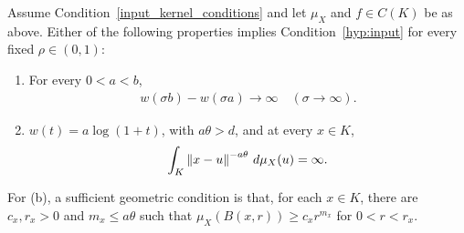 \begin{proposition}\label{prop:global-calibration}
Assume Condition~\ref{input_kernel_conditions} and let $\mu_X$ and $f\in C(K)$ be as above. Either of the following properties implies Condition~\ref{hyp:input} for every fixed $\rho\in(0,1)$:
\begin{enumerate}[label=(\alph*),leftmargin=*]
\item For every $0<a<b$,
\begin{align}\label{eq:input-separation}
w(\sigma b)-w(\sigma a)\longrightarrow\infty\quad(\sigma\to\infty).
\end{align}
\item $w(t)=a\log(1+t)$, with $a\theta>d$, and at every $x\in K$,
\begin{align}\label{eq:inverse-mass}
\int_K\left\lVert x-u\right\rVert^{-a\theta}\,d\mu_X(u)=\infty.
\end{align}
\end{enumerate}
For (b), a sufficient geometric condition is that, for each $x\in K$, there are $c_x,r_x>0$ and $m_x\leq a\theta$ such that $\mu_X(B(x,r))\geq c_xr^{m_x}$ for $0<r<r_x$.
\end{proposition}
